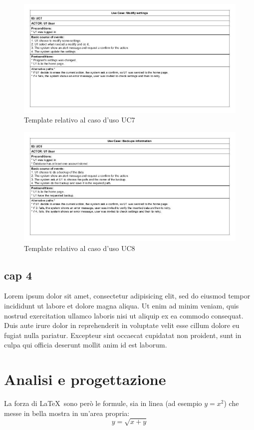 \documentclass[a4paper,10pt]{report} %
\begin{document}
		\begin{figure}[htbp]
			\centering
			\includegraphics[width = \textwidth]{immagini/USE_CASE_TEMPLATE/UC07.jpg}
			\caption{Template relativo al caso d'uso UC7}
			\end{figure}
		\begin{figure}[htbp]
			\centering
			\includegraphics[width = \textwidth]{immagini/USE_CASE_TEMPLATE/UC08.jpg}
			\caption{Template relativo al caso d'uso UC8}
			\end{figure}
  \section{cap 4}
    Lorem ipsum dolor sit amet, consectetur adipisicing elit, sed do eiusmod tempor incididunt ut labore et dolore magna aliqua. Ut enim ad minim veniam, quis nostrud exercitation ullamco laboris nisi ut aliquip ex ea commodo consequat. Duis aute irure dolor in reprehenderit in voluptate velit esse cillum dolore eu fugiat nulla pariatur. Excepteur sint occaecat cupidatat non proident, sunt in culpa qui officia deserunt mollit anim id est laborum.
\newpage
\chapter{Analisi e progettazione} %
  La forza di \LaTeX\ sono però le formule, sia in linea (ad esempio \(y=x^2\))
   che messe in bella mostra in un'area propria:
  \[y=\sqrt{x+y}\]
\end{document}
